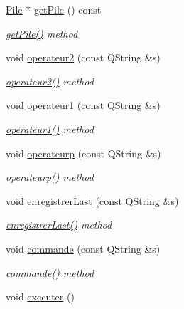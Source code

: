 \begin{DoxyCompactItemize}
\hyperlink{class_pile}{Pile} $\ast$ \hyperlink{class_calculatrice_ae2d0c9c7d1d378d65d1cab56124d29c8}{get\+Pile} () const 
\begin{DoxyCompactList}\small\item\em \hyperlink{class_calculatrice_ae2d0c9c7d1d378d65d1cab56124d29c8}{get\+Pile()} method \end{DoxyCompactList}\item 
void \hyperlink{class_calculatrice_a48c8aa03ff4562c5794a62e4e485fc39}{operateur2} (const Q\+String \&s)
\begin{DoxyCompactList}\small\item\em \hyperlink{class_calculatrice_a48c8aa03ff4562c5794a62e4e485fc39}{operateur2()} method \end{DoxyCompactList}\item 
void \hyperlink{class_calculatrice_ae82762b5bb2cadd28af3534353ce0431}{operateur1} (const Q\+String \&s)
\begin{DoxyCompactList}\small\item\em \hyperlink{class_calculatrice_ae82762b5bb2cadd28af3534353ce0431}{operateur1()} method \end{DoxyCompactList}\item 
void \hyperlink{class_calculatrice_a567873272e220894b3ddc5909c20b0a7}{operateurp} (const Q\+String \&s)
\begin{DoxyCompactList}\small\item\em \hyperlink{class_calculatrice_a567873272e220894b3ddc5909c20b0a7}{operateurp()} method \end{DoxyCompactList}\item 
void \hyperlink{class_calculatrice_aeda02ec9d861a66f67d75757db227504}{enregistrer\+Last} (const Q\+String \&s)
\begin{DoxyCompactList}\small\item\em \hyperlink{class_calculatrice_aeda02ec9d861a66f67d75757db227504}{enregistrer\+Last()} method \end{DoxyCompactList}\item 
void \hyperlink{class_calculatrice_ae96458c336f6b14ead0ae2086828d9bb}{commande} (const Q\+String \&s)
\begin{DoxyCompactList}\small\item\em \hyperlink{class_calculatrice_ae96458c336f6b14ead0ae2086828d9bb}{commande()} method \end{DoxyCompactList}\item 
void \hyperlink{class_calculatrice_a18952ea12781a4b3ca6147ff10298db7}{executer} ()

\end{DoxyCompactItemize}
